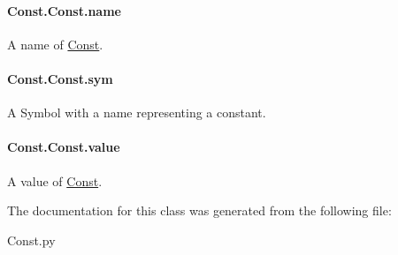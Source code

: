 \paragraph[{\texorpdfstring{name}{name}}]{\setlength{\rightskip}{0pt plus 5cm}Const.\+Const.\+name}\hypertarget{classConst_1_1Const_a9c35d073f6c11a53c69e6ff49fc533fd}{}\label{classConst_1_1Const_a9c35d073f6c11a53c69e6ff49fc533fd}


A name of \hyperlink{classConst_1_1Const}{Const}. 

\paragraph[{\texorpdfstring{sym}{sym}}]{\setlength{\rightskip}{0pt plus 5cm}Const.\+Const.\+sym}\hypertarget{classConst_1_1Const_a26c0914afa6a1dc500197d3e2f34b08d}{}\label{classConst_1_1Const_a26c0914afa6a1dc500197d3e2f34b08d}


A Symbol with a {\ttfamily name} representing a constant. 

\paragraph[{\texorpdfstring{value}{value}}]{\setlength{\rightskip}{0pt plus 5cm}Const.\+Const.\+value}\hypertarget{classConst_1_1Const_a6544b1f996da56e81a7c82fd1bf4562f}{}\label{classConst_1_1Const_a6544b1f996da56e81a7c82fd1bf4562f}


A value of \hyperlink{classConst_1_1Const}{Const}. 



The documentation for this class was generated from the following file\+:\begin{DoxyCompactItemize}
\item 
Const.\+py\end{DoxyCompactItemize}
